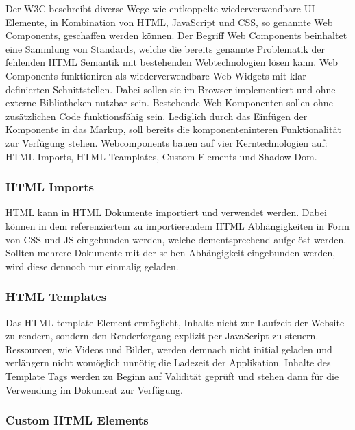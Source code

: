 Der W3C beschreibt diverse Wege wie entkoppelte wiederverwendbare UI Elemente,
in Kombination von HTML, JavaScript und CSS, so genannte Web Components, geschaffen werden können.
Der Begriff Web Components beinhaltet eine Sammlung von Standards,
welche die bereits genannte Problematik der fehlenden HTML Semantik mit bestehenden Webtechnologien lösen kann.
Web Components funktioniren als wiederverwendbare Web Widgets mit klar definierten Schnittstellen.
Dabei sollen sie im Browser implementiert und ohne externe Bibliotheken nutzbar sein.
Bestehende Web Komponenten sollen ohne zusätzlichen Code funktionsfähig sein. Lediglich durch das Einfügen der Komponente
in das Markup, soll bereits die komponenteninteren Funktionalität zur Verfügung stehen.
\cite[42]{Web-Component-Architecture}
Webcomponents bauen auf vier Kerntechnologien auf: HTML Imports, HTML Teamplates, Custom Elements und Shadow Dom.

\subsubsection{HTML Imports}
HTML kann in HTML Dokumente importiert und verwendet werden.
Dabei können in dem referenziertem zu importierendem HTML Abhängigkeiten in Form von CSS und JS eingebunden werden,
welche dementsprechend aufgelöst werden.
Sollten mehrere Dokumente mit der selben Abhängigkeit eingebunden werden, wird diese dennoch nur einmalig geladen.
\cite{HTMLI44:online}

\vspace{1cm}

\vspace{1cm}

\subsubsection{HTML Templates}

Das HTML template-Element ermöglicht, Inhalte nicht zur Laufzeit der Website zu rendern,
sondern den Renderforgang explizit per JavaScript zu steuern. Ressourcen, wie Videos und Bilder, werden demnach
nicht initial geladen und verlängern nicht womöglich unnötig die Ladezeit der Applikation.
Inhalte des Template Tags werden zu Beginn auf Validität geprüft und stehen dann für die Verwendung im Dokument
zur Verfügung.

\subsubsection{Custom HTML Elements}

